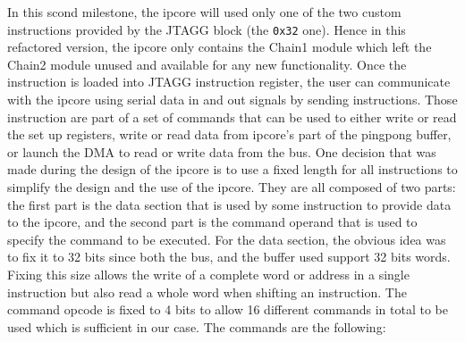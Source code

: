 \documentclass[a4paper,11pt,oneside]{report}
\begin{document}
In this scond milestone, the ipcore will used only one of the two custom instructions provided by the JTAGG block (the \texttt{0x32} one). Hence in this 
refactored version, the ipcore only contains the Chain1 module which left the Chain2 module unused and available for any new functionality.
Once the instruction is loaded into JTAGG instruction register, the user can communicate with the ipcore using serial data in and out signals by sending 
instructions.
Those instruction are part of a set of commands that can be used to either write or read the set up registers, write or read data from ipcore's part of the pingpong buffer,
or launch the DMA to read or write data from the bus.
One decision that was made during the design of the ipcore is to use a fixed length for all instructions to simplify the design and the use of the ipcore.
They are all composed of two parts: the first part is the data section that is used by some instruction to provide data to the ipcore, and the second part is the command 
operand that is used to specify the command to be executed.
For the data section, the obvious idea was to fix it to 32 bits since both the bus, and the buffer used support 32 bits words. Fixing this size allows the write
of a complete word or address in a single instruction but also read a whole word when shifting an instruction.
The command opcode is fixed to 4 bits to allow 16 different commands in total to be used which is sufficient in our case.
The commands are the following:
\end{document}
